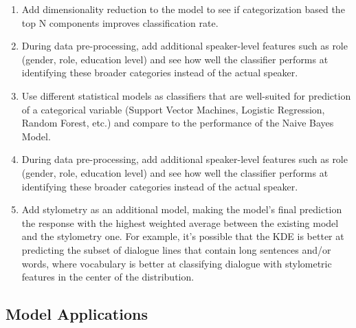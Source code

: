 \documentclass{article}
\begin{document}
\begin{titlepage}
\begin{enumerate}
\item Add dimensionality reduction to the model to see if categorization based the top N components improves classification rate.
\item During data pre-processing, add additional speaker-level features such as role (gender, role, education level) and see how well the classifier performs at identifying these broader categories instead of the actual speaker.
\item Use different statistical models as classifiers that are well-suited for prediction of a categorical variable (Support Vector Machines, Logistic Regression, Random Forest, etc.) and compare to the performance of the Naive Bayes Model.
\item During data pre-processing, add additional speaker-level features such as role (gender, role, education level) and see how well the classifier performs at identifying these broader categories instead of the actual speaker.
\item Add stylometry as an additional model, making the model's final prediction the response with the highest weighted average between the existing model and the stylometry one. For example, it's possible that the KDE is better at predicting the subset of dialogue lines that contain long sentences and/or words, where vocabulary is better at classifying dialogue with stylometric features in the center of the distribution.
\end{enumerate}

\subsection{Model Applications}


\end{titlepage}
\end{document}
